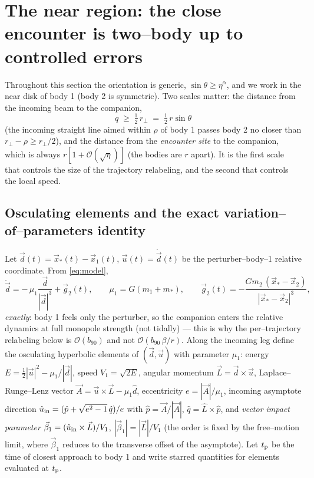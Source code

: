 \documentclass[11pt]{article}
\newcommand{\rp}{r_\perp}
\newcommand{\bnt}{b_{90}}
\newcommand{\order}[1]{\mathcal O\!\left(#1\right)}
\begin{document}
\section{The near region: the close encounter is two--body up to controlled errors}
\label{sec:near}

Throughout this section the orientation is generic, $\sin\theta\ge\eta^\alpha$, and we work in the
near disk of body 1 (body 2 is symmetric). Two scales matter: the distance from the incoming beam to
the companion,
\begin{equation}
  q\;\ge\;\tfrac12\,\rp\;=\;\tfrac12\,r\sin\theta
  \label{eq:qdef}
\end{equation}
(the incoming straight line aimed within $\rho$ of body 1 passes body 2 no closer than
$\rp-\rho\ge\rp/2$), and the distance from the \emph{encounter site} to the companion, which is
always $r[1+\order{\sqrt\eta}]$ (the bodies are $r$ apart). It is the first scale that controls the
size of the trajectory relabeling, and the second that controls the local speed.

\subsection{Osculating elements and the exact variation--of--parameters identity}
\label{sec:osc}
Let $\vec d(t)=\vec x_*(t)-\vec x_1(t)$, $\vec u(t)=\dot{\vec d}(t)$ be the perturber--body--1
relative coordinate. From \eqref{eq:model},
\begin{equation}
  \ddot{\vec d}=-\,\mu_1\frac{\vec d}{|\vec d|^3}+\vec g_2(t),\qquad
  \mu_1=G(m_1+m_*),\qquad
  \vec g_2(t)=-\frac{Gm_2\,(\vec x_*-\vec x_2)}{|\vec x_*-\vec x_2|^3},
  \label{eq:releq}
\end{equation}
\emph{exactly}: body 1 feels only the perturber, so the companion enters the relative dynamics at
full monopole strength (not tidally) --- this is why the per--trajectory relabeling below is
$\order{\bnt}$ and not $\order{\bnt\,\beta/r}$. Along the incoming leg define the osculating
hyperbolic elements of $(\vec d,\vec u)$ with parameter $\mu_1$: energy
$E=\tfrac12|\vec u|^2-\mu_1/|\vec d|$, speed $V_1=\sqrt{2E}$, angular momentum
$\vec L=\vec d\times\vec u$, Laplace--Runge--Lenz vector
$\vec A=\vec u\times\vec L-\mu_1\hat d$, eccentricity $e=|\vec A|/\mu_1$, incoming asymptote
direction $\hat u_{\rm in}=(\hat p+\sqrt{e^2-1}\,\hat q)/e$ with $\hat p=\vec A/|\vec A|$,
$\hat q=\hat L\times\hat p$, and \emph{vector impact parameter}
$\vec\beta_1=(\hat u_{\rm in}\times\vec L)/V_1$, $|\vec\beta_1|=|\vec L|/V_1$ (the order is fixed by
the free--motion limit, where $\vec\beta_1$ reduces to the transverse offset of the asymptote). Let $t_{\rm p}$ be
the time of closest approach to body 1 and write starred quantities for elements evaluated at
$t_{\rm p}$.
\end{document}
